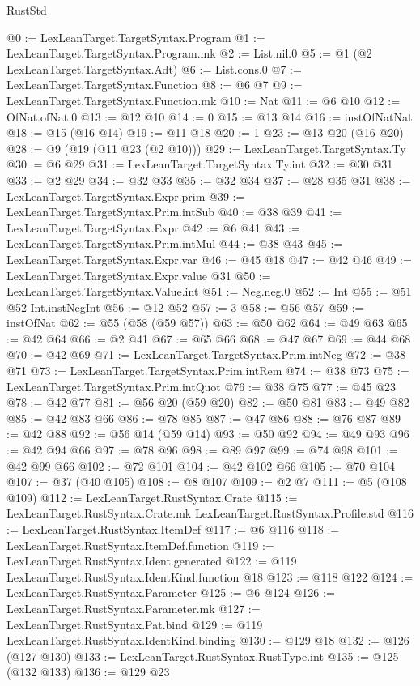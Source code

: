 \begin{lexlean}{RustStd}
\begin{coremodule}
@0 := LexLeanTarget.TargetSyntax.Program
@1 := LexLeanTarget.TargetSyntax.Program.mk
@2 := List.nil.{0}
@5 := @1 (@2 LexLeanTarget.TargetSyntax.Adt)
@6 := List.cons.{0}
@7 := LexLeanTarget.TargetSyntax.Function
@8 := @6 @7
@9 := LexLeanTarget.TargetSyntax.Function.mk
@10 := Nat
@11 := @6 @10
@12 := OfNat.ofNat.{0}
@13 := @12 @10
@14 := 0
@15 := @13 @14
@16 := instOfNatNat
@18 := @15 (@16 @14)
@19 := @11 @18
@20 := 1
@23 := @13 @20 (@16 @20)
@28 := @9 (@19 (@11 @23 (@2 @10)))
@29 := LexLeanTarget.TargetSyntax.Ty
@30 := @6 @29
@31 := LexLeanTarget.TargetSyntax.Ty.int
@32 := @30 @31
@33 := @2 @29
@34 := @32 @33
@35 := @32 @34
@37 := @28 @35 @31
@38 := LexLeanTarget.TargetSyntax.Expr.prim
@39 := LexLeanTarget.TargetSyntax.Prim.intSub
@40 := @38 @39
@41 := LexLeanTarget.TargetSyntax.Expr
@42 := @6 @41
@43 := LexLeanTarget.TargetSyntax.Prim.intMul
@44 := @38 @43
@45 := LexLeanTarget.TargetSyntax.Expr.var
@46 := @45 @18
@47 := @42 @46
@49 := LexLeanTarget.TargetSyntax.Expr.value @31
@50 := LexLeanTarget.TargetSyntax.Value.int
@51 := Neg.neg.{0}
@52 := Int
@55 := @51 @52 Int.instNegInt
@56 := @12 @52
@57 := 3
@58 := @56 @57
@59 := instOfNat
@62 := @55 (@58 (@59 @57))
@63 := @50 @62
@64 := @49 @63
@65 := @42 @64
@66 := @2 @41
@67 := @65 @66
@68 := @47 @67
@69 := @44 @68
@70 := @42 @69
@71 := LexLeanTarget.TargetSyntax.Prim.intNeg
@72 := @38 @71
@73 := LexLeanTarget.TargetSyntax.Prim.intRem
@74 := @38 @73
@75 := LexLeanTarget.TargetSyntax.Prim.intQuot
@76 := @38 @75
@77 := @45 @23
@78 := @42 @77
@81 := @56 @20 (@59 @20)
@82 := @50 @81
@83 := @49 @82
@85 := @42 @83 @66
@86 := @78 @85
@87 := @47 @86
@88 := @76 @87
@89 := @42 @88
@92 := @56 @14 (@59 @14)
@93 := @50 @92
@94 := @49 @93
@96 := @42 @94 @66
@97 := @78 @96
@98 := @89 @97
@99 := @74 @98
@101 := @42 @99 @66
@102 := @72 @101
@104 := @42 @102 @66
@105 := @70 @104
@107 := @37 (@40 @105)
@108 := @8 @107
@109 := @2 @7
@111 := @5 (@108 @109)
@112 := LexLeanTarget.RustSyntax.Crate
@115 := LexLeanTarget.RustSyntax.Crate.mk LexLeanTarget.RustSyntax.Profile.std
@116 := LexLeanTarget.RustSyntax.ItemDef
@117 := @6 @116
@118 := LexLeanTarget.RustSyntax.ItemDef.function
@119 := LexLeanTarget.RustSyntax.Ident.generated
@122 := @119 LexLeanTarget.RustSyntax.IdentKind.function @18
@123 := @118 @122
@124 := LexLeanTarget.RustSyntax.Parameter
@125 := @6 @124
@126 := LexLeanTarget.RustSyntax.Parameter.mk
@127 := LexLeanTarget.RustSyntax.Pat.bind
@129 := @119 LexLeanTarget.RustSyntax.IdentKind.binding
@130 := @129 @18
@132 := @126 (@127 @130)
@133 := LexLeanTarget.RustSyntax.RustType.int
@135 := @125 (@132 @133)
@136 := @129 @23

\end{coremodule}
\end{lexlean}
